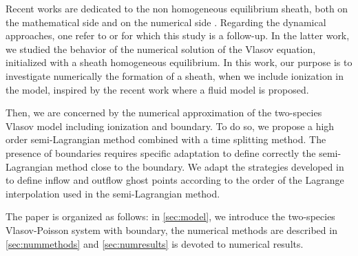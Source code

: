 \documentclass{article}
\numberwithin{equation}{section}
\begin{document}
Recent works are dedicated to the non homogeneous equilibrium sheath, both on the mathematical side and on the numerical side \cite{badsiCollisionalSheathSolutions2021, badsiStableFixedPoint2021, despresMinimizationFormulationBikinetic2016}. 
Regarding the dynamical approaches, one refer to \cite{couletteEulerianVlasovCode2014,bourneNonUniformSplinesSemiLagrangian2022} 
or \cite{badsiNumericalStabilityPlasma2018} for which this study is a follow-up. 
In the latter work, we studied the behavior of the numerical solution of the Vlasov equation, initialized with a sheath
homogeneous equilibrium. In this work, our purpose is to investigate numerically the formation of a sheath, 
when we include ionization in the model, inspired by the recent work
\cite{alvarezlagunaAsymptoticPreservingWellbalanced2020}
where a fluid model 
is proposed.   

Then, we are concerned by the numerical approximation of the two-species Vlasov model including ionization and boundary. 
To do so, we propose a high order semi-Lagrangian method combined with a time splitting method. 
The presence of boundaries requires specific adaptation to define correctly the semi-Lagrangian method close to the boundary. 
We adapt the strategies developed in \cite{coulombelNeumannNumericalBoundary2020, boutinHighOrderNumerical2021} 
to define inflow and outflow ghost points according to the order of the Lagrange interpolation used in the semi-Lagrangian method.  

The paper is organized as follows: in \cref{sec:model}, we introduce the two-species Vlasov-Poisson system with boundary,  
the numerical methods are described in \cref{sec:nummethods} and \cref{sec:numresults} is devoted to numerical results. 
\end{document}
